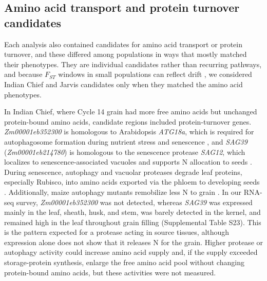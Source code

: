 \documentclass[namedate,unnumsec,webpdf,contemporary,large]{oup-authoring-template}
\begin{document}
\subsection{Amino acid transport and protein turnover candidates}

Each analysis also contained candidates for amino acid transport or protein turnover, and these differed among populations in ways that mostly matched their phenotypes. They are individual candidates rather than recurring pathways, and because $F_{ST}$ windows in small populations can reflect drift \citep{Gerke2015DriftRRS}, we considered Indian Chief and Jarvis candidates only when they matched the amino acid phenotypes.

In Indian Chief, where Cycle 14 grain had more free amino acids but unchanged protein-bound amino acids, candidate regions included protein-turnover genes. \textit{Zm00001eb352300} is homologous to Arabidopsis \textit{ATG18a}, which is required for autophagosome formation during nutrient stress and senescence \citep{Xiong2005ATG18a}, and \textit{SAG39} (\textit{Zm00001eb214780}) is homologous to the senescence protease \textit{SAG12}, which localizes to senescence-associated vacuoles and supports N allocation to seeds \citep{Otegui2005SAV, James2018SAG12}. During senescence, autophagy and vacuolar proteases degrade leaf proteins, especially Rubisco, into amino acids exported via the phloem to developing seeds \citep{Feller2008Rubiscolytics, Have2017NRemobilization}. Additionally, maize autophagy mutants remobilize less N to grain \citep{Li2015MaizeAutophagy}. In our RNA-seq survey, \textit{Zm00001eb352300} was not detected, whereas \textit{SAG39} was expressed mainly in the leaf, sheath, husk, and stem, was barely detected in the kernel, and remained high in the leaf throughout grain filling (Supplemental Table S23). This is the pattern expected for a protease acting in source tissues, although expression alone does not show that it releases N for the grain. Higher protease or autophagy activity could increase amino acid supply and, if the supply exceeded storage-protein synthesis, enlarge the free amino acid pool without changing protein-bound amino acids, but these activities were not measured.
\end{document}
